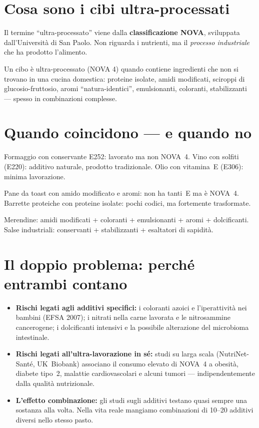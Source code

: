 \documentclass[a5paper,12pt,oneside,openany]{book}
\newcommand{\boxverde}[2]{%
  \begin{tcolorbox}[boxbase,
    colback=verdescuro!8!white, colframe=verdescuro, title={#1}]
  #2\end{tcolorbox}}
\newcommand{\boxgiallo}[2]{%
  \begin{tcolorbox}[boxbase,
    colback=giallo!12!white, colframe=giallo!80!black, title={#1}]
  #2\end{tcolorbox}}
\newcommand{\boxrosso}[2]{%
  \begin{tcolorbox}[boxbase,
    colback=rosso!8!white, colframe=rosso, title={#1}]
  #2\end{tcolorbox}}
\begin{document}
\section{Cosa sono i cibi ultra-processati}

Il termine ``ultra-processato'' viene dalla \textbf{classificazione NOVA},
sviluppata dall'Università di San Paolo. Non riguarda i nutrienti, ma il
\emph{processo industriale} che ha prodotto l'alimento.

Un cibo è ultra-processato (NOVA 4) quando contiene ingredienti che non
si trovano in una cucina domestica: proteine isolate, amidi modificati,
sciroppi di glucosio-fruttosio, aromi ``natura-identici'', emulsionanti,
coloranti, stabilizzanti --- spesso in combinazioni complesse.

\section{Quando coincidono --- e quando no}

\boxverde{Additivi ma NON ultra-processato}{Formaggio con conservante E252:
lavorato ma non NOVA~4. Vino con solfiti (E220): additivo naturale,
prodotto tradizionale. Olio con vitamina~E (E306): minima lavorazione.}

\boxrosso{Ultra-processato con POCHI additivi~E}{Pane da toast con amido
modificato e aromi: non ha tanti~E ma è NOVA~4. Barrette proteiche con
proteine isolate: pochi codici, ma fortemente trasformate.}

\boxgiallo{Ultra-processato E con tanti additivi (il caso peggiore)}{Merendine:
amidi modificati + coloranti + emulsionanti + aromi + dolcificanti. Salse
industriali: conservanti + stabilizzanti + esaltatori di sapidità.}

\section{Il doppio problema: perché entrambi contano}

\begin{itemize}
  \item \textbf{Rischi legati agli additivi specifici:} i coloranti azoici
    e l'iperattività nei bambini (EFSA 2007); i nitrati nella carne
    lavorata e le nitrosammine cancerogene; i dolcificanti intensivi e la
    possibile alterazione del microbioma intestinale.
  \item \textbf{Rischi legati all'ultra-lavorazione in sé:} studi su larga
    scala (NutriNet-Santé, UK~Biobank) associano il consumo elevato di
    NOVA~4 a obesità, diabete tipo~2, malattie cardiovascolari e alcuni
    tumori --- indipendentemente dalla qualità nutrizionale.
  \item \textbf{L'effetto combinazione:} gli studi sugli additivi testano
    quasi sempre una sostanza alla volta. Nella vita reale mangiamo
    combinazioni di 10--20 additivi diversi nello stesso pasto.
\end{itemize}
\end{document}
